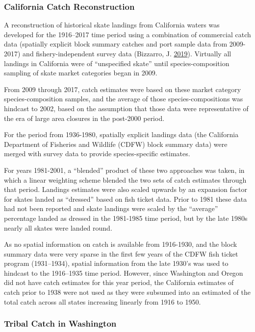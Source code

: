 \documentclass[12pt,]{article}
\begin{document}
\hypertarget{california-catch-reconstruction}{%
\subsubsection{California Catch
Reconstruction}\label{california-catch-reconstruction}}

A reconstruction of historical skate landings from California waters was
developed for the 1916--2017 time period using a combination of
commercial catch data (spatially explicit block summary catches and port
sample data from 2009-2017) and fishery-independent survey data
(Bizzarro, J. \protect\hyperlink{ref-Bizzarro2019}{2019}). Virtually all
landings in California were of ``unspecified skate'' until
species-composition sampling of skate market categories began in 2009.

From 2009 through 2017, catch estimates were based on these market
category species-composition samples, and the average of those
species-compositions was hindcast to 2002, based on the assumption that
those data were representative of the era of large area closures in the
post-2000 period.

For the period from 1936-1980, spatially explicit landings data (the
California Department of Fisheries and Wildlife (CDFW) block summary
data) were merged with survey data to provide species-specific
estimates.

For years 1981-2001, a ``blended'' product of these two approaches was
taken, in which a linear weighting scheme blended the two sets of catch
estimates through that period. Landings estimates were also scaled
upwards by an expansion factor for skates landed as ``dressed'' based on
fish ticket data. Prior to 1981 these data had not been reported and
skate landings were scaled by the ``average'' percentage landed as
dressed in the 1981-1985 time period, but by the late 1980s nearly all
skates were landed round.

As no spatial information on catch is available from 1916-1930, and the
block summary data were very sparse in the first few years of the CDFW
fish ticket program (1931--1934), spatial information from the late
1930's was used to hindcast to the 1916--1935 time period. However,
since Washington and Oregon did not have catch estimates for this year
period, the California estimates of catch prior to 1938 were not used as
they were subsumed into an estimated of the total catch across all
states increasing linearly from 1916 to 1950.

\hypertarget{tribal-catch-in-washington}{%
\subsubsection{Tribal Catch in
Washington}\label{tribal-catch-in-washington}}
\end{document}
